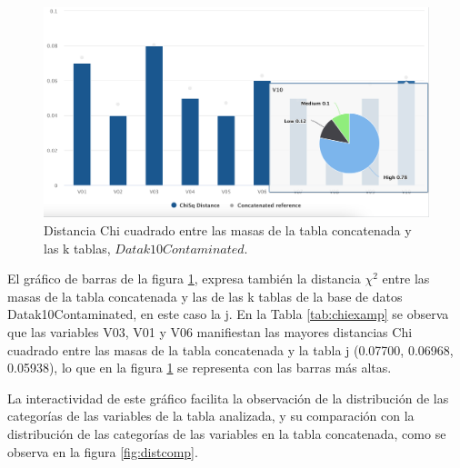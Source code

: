 \documentclass[mathematics,article,submit,moreauthors,pdftex]{mdpi}
\begin{document}
\begin{figure}[H]


\begin{center}\includegraphics[width=0.9\linewidth,]{Chisqr} \end{center}

\caption{Distancia Chi cuadrado entre las masas de la tabla concatenada y las k tablas, $Datak10Contaminated$.}

\label{fig:chisqr}
\end{figure}

El gráfico de barras de la figura \ref{fig:chisqr}, expresa también la
distancia \(\chi^{2}\) entre las masas de la tabla concatenada y las de
las k tablas de la base de datos Datak10Contaminated, en este caso la j.
En la Tabla \ref{tab:chiexamp} se observa que las variables V03, V01 y
V06 manifiestan las mayores distancias Chi cuadrado entre las masas de
la tabla concatenada y la tabla j (0.07700, 0.06968, 0.05938), lo que en
la figura \ref{fig:chisqr} se representa con las barras más altas.

La interactividad de este gráfico facilita la observación de la
distribución de las categorías de las variables de la tabla analizada, y
su comparación con la distribución de las categorías de las variables en
la tabla concatenada, como se observa en la figura \ref{fig:distcomp}.
\end{document}
